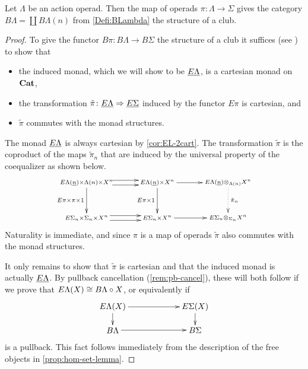 \begin{thm}\label{thm:pi-club}
Let $\Lambda$ be an action operad. Then the map of operads $\pi \colon \Lambda \rightarrow \Sigma$ gives the category $B\Lambda = \coprod B\Lambda(n)$ from \cref{Defi:BLambda} the structure of a club.
\end{thm}
\begin{proof}
To give the functor $B\pi \colon B\Lambda \rightarrow B \Sigma$ the structure of a club it suffices (see \cite[Section 6.2]{leinster}) to show that
\begin{itemize}
\item the induced monad, which we will show to be $\underline{E\Lambda}$, is a cartesian monad on $\mathbf{Cat}$,
\item the transformation $\tilde{\pi} \colon \underline{E\Lambda} \Rightarrow \underline{E\Sigma}$ induced by the functor $E\pi$ is cartesian, and
\item $\tilde{\pi}$ commutes with the monad structures.
\end{itemize}
The monad $\underline{E\Lambda}$ is always cartesian by \cref{cor:EL-2cart}. The transformation $\tilde{\pi}$ is the coproduct of the maps $\tilde{\pi}_{n}$ that are induced by the universal property of the coequalizer as shown below.
  \[
    \xy
      (0,0)*+{\scriptstyle \ELn \times \Lambda(n) \times X^n} ="00";
      (0,-15)*+{\scriptstyle E\Sigma_{n} \times \Sigma_{n} \times X^n} ="01";
      (30,0)*+{\scriptstyle \ELn \times X^n} ="10";
      (30,-15)*+{\scriptstyle E\Sigma_{n} \times X^n} ="11";
      (60,0)*+{\scriptstyle \ELn \otimes_{\Lambda(n)} X^n} ="20";
      (60,-15)*+{\scriptstyle E\Sigma_{n} \otimes_{\Sigma_{n}}  X^n} ="21";
      {\ar (11,1)*{}; (22,1)*{} };
      {\ar (11,-1)*{}; (22,-1)*{} };
      {\ar_{E\pi \times \pi \times 1} "00" ; "01"};
      {\ar (10,-14)*{}; (23,-14)*{} };
      {\ar (10,-16)*{}; (23,-16)*{} };
      {\ar_{E\pi \times 1} "10" ; "11"};
      {\ar@{.>}^{\tilde{\pi}_{n}} "20" ; "21"};
      {\ar "10" ; "20"};
      {\ar "11" ; "21"};
    \endxy
  \]
Naturality is immediate, and since $\pi$ is a map of operads $\tilde{\pi}$ also commutes with the monad structures.

It only remains to show that $\tilde{\pi}$ is cartesian and that the induced monad is actually $\underline{E\Lambda}$. 
By pullback cancellation (\cref{rem:pb-cancel}), these will both follow if we prove that $E\Lambda(X) \cong B\Lambda \circ X$, or equivalently if
 \begin{equation}\label{eqn:pb-club}
    \xy
      (0,0)*+{E\Lambda(X)} ="00";
      (0,-10)*+{B\Lambda} ="01";
      (35,0)*+{E\Sigma(X)} ="10";
      (35,-10)*+{B\Sigma} ="11";
      {\ar^{} "00" ; "10"};
      {\ar^{} "10" ; "11"};
      {\ar^{} "00" ; "01"};
      {\ar^{} "01" ; "11"};
    \endxy
  \end{equation}
  is a pullback. This fact follows immediately from the description of the free objects in \cref{prop:hom-set-lemma}.
\end{proof}


